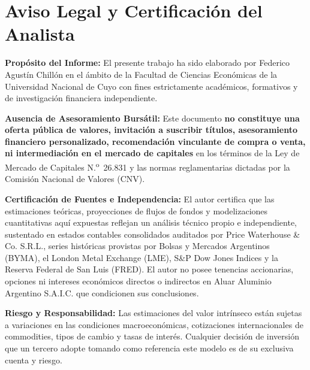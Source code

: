\documentclass[10pt,a4paper]{article}
\begin{document}
\vspace{0.6cm}
\section*{Aviso Legal y Certificación del Analista}

\begin{tcolorbox}[colback=lightgray!30, colframe=gsnavy, boxrule=0.8pt, arc=3pt, title={\small\sffamily \textbf{Declaración de Independencia y Descargo de Responsabilidad (Ley 26.831 / CNV)}}, coltitle=white]
\scriptsize
\textbf{Propósito del Informe:} El presente trabajo ha sido elaborado por Federico Agustín Chillón en el ámbito de la Facultad de Ciencias Económicas de la Universidad Nacional de Cuyo con fines estrictamente académicos, formativos y de investigación financiera independiente. 

\vspace{2pt}
\textbf{Ausencia de Asesoramiento Bursátil:} Este documento \textbf{no constituye una oferta pública de valores, invitación a suscribir títulos, asesoramiento financiero personalizado, recomendación vinculante de compra o venta, ni intermediación en el mercado de capitales} en los términos de la Ley de Mercado de Capitales N.\textsuperscript{o}~26.831 y las normas reglamentarias dictadas por la Comisión Nacional de Valores (CNV). 

\vspace{2pt}
\textbf{Certificación de Fuentes e Independencia:} El autor certifica que las estimaciones teóricas, proyecciones de flujos de fondos y modelizaciones cuantitativas aquí expuestas reflejan un análisis técnico propio e independiente, sustentado en estados contables consolidados auditados por Price Waterhouse \& Co. S.R.L., series históricas provistas por Bolsas y Mercados Argentinos (BYMA), el London Metal Exchange (LME), S\&P Dow Jones Indices y la Reserva Federal de San Luis (FRED). El autor no posee tenencias accionarias, opciones ni intereses económicos directos o indirectos en Aluar Aluminio Argentino S.A.I.C. que condicionen sus conclusiones.

\vspace{2pt}
\textbf{Riesgo y Responsabilidad:} Las estimaciones del valor intrínseco están sujetas a variaciones en las condiciones macroeconómicas, cotizaciones internacionales de commodities, tipos de cambio y tasas de interés. Cualquier decisión de inversión que un tercero adopte tomando como referencia este modelo es de su exclusiva cuenta y riesgo.
\end{tcolorbox}
\end{document}
